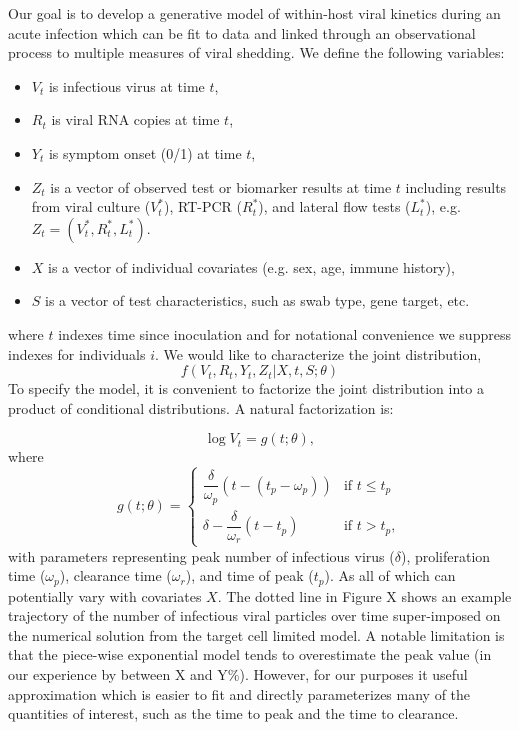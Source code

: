 \documentclass[11pt]{article}
\begin{document}
Our goal is to develop a generative model of within-host viral kinetics during an acute infection which can be fit to data and linked through an observational process to multiple measures of viral shedding. We define the following variables:
\begin{itemize}
    \item $V_t$ is infectious virus at time $t$,
    \item $R_t$ is viral RNA copies at time $t$,
    \item $Y_t$ is symptom onset (0/1) at time $t$,
    \item $Z_t$ is a vector of observed test or biomarker results at time $t$ including results from viral culture ($V^*_t$), RT-PCR ($R^*_t$), and lateral flow tests ($L^*_t$), e.g. $Z_t = (V^*_t, R^*_t, L^*_t)$.
    \item $X$ is a vector of individual covariates (e.g. sex, age, immune history),
    \item $S$ is a vector of test characteristics, such as swab type, gene target, etc.
\end{itemize}
where $t$ indexes time since inoculation and for notational convenience we suppress indexes for individuals $i$. We would like to characterize the joint distribution, 
$$
f(V_t, R_t, Y_t, Z_t | X, t, S; \theta)
$$
To specify the model, it is convenient to factorize the joint distribution into a product of conditional distributions. A natural factorization is:

\begin{equation*}
    \log V_t = g(t; \theta),
\end{equation*}
where
\begin{equation*}
    g(t; \theta) = \begin{cases}
   \dfrac{\delta}{\omega_p} (t - (t_p - \omega_p)) & \text{if } t \leq t_p \\
    \delta - \dfrac{\delta}{\omega_r} (t - t_p) & \text{if } t > t_p,
\end{cases}
\end{equation*}
with parameters representing peak number of infectious virus ($\delta$), proliferation time ($\omega_p$), clearance time ($\omega_r$), and time of peak ($t_p$). As all of which can potentially vary with covariates $X$. The dotted line in Figure X shows an example trajectory of the number of infectious viral particles over time super-imposed on the numerical solution from the target cell limited model. A notable limitation is that the piece-wise exponential model tends to overestimate the peak value (in our experience by between X and Y\%). However, for our purposes it useful approximation which is easier to fit and directly parameterizes many of the quantities of interest, such as the time to peak and the time to clearance.
\end{document}
